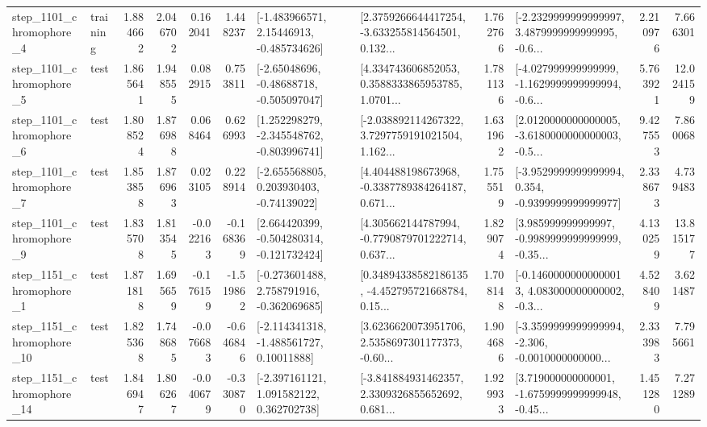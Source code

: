 \begin{tabular}{llrrrrllrlrr}
  step\_1101\_chromophore\_4 &  training &      1.884662 &    2.046702 &      0.162041 &  1.448237 &    [-1.483966571, 2.15446913, -0.485734626] &  [2.3759266644417254, -3.633255814564501, 0.132... &       1.762766 &  [-2.2329999999999997, 3.4879999999999995, -0.6... &            2.210976 &          7.666301 \\
  step\_1101\_chromophore\_5 &      test &      1.865641 &    1.948555 &      0.082915 &  0.753811 &    [-2.65048696, -0.48688718, -0.505097047] &  [4.334743606852053, 0.3588333865953785, 1.0701... &       1.781136 &  [-4.027999999999999, -1.1629999999999994, -0.6... &            5.763921 &         12.024159 \\
  step\_1101\_chromophore\_6 &      test &      1.808524 &    1.876988 &      0.068464 &  0.626993 &   [1.252298279, -2.345548762, -0.803996741] &  [-2.038892114267322, 3.7297759191021504, 1.162... &       1.631962 &  [2.0120000000000005, -3.6180000000000003, -0.5... &            9.427553 &          7.860068 \\
  step\_1101\_chromophore\_7 &      test &      1.853858 &    1.876963 &      0.023105 &  0.228914 &    [-2.655568805, 0.203930403, -0.74139022] &  [4.404488198673968, -0.3387789384264187, 0.671... &       1.755519 &  [-3.9529999999999994, 0.354, -0.9399999999999977] &            2.338673 &          4.739483 \\
  step\_1101\_chromophore\_9 &      test &      1.835708 &    1.813545 &     -0.022163 & -0.168369 &   [2.664420399, -0.504280314, -0.121732424] &  [4.305662144787994, -0.7790879701222714, 0.637... &       1.829074 &  [3.985999999999997, -0.9989999999999999, -0.35... &            4.130259 &         13.815177 \\
  step\_1151\_chromophore\_1 &      test &      1.871818 &    1.695659 &     -0.176159 & -1.519862 &   [-0.273601488, 2.758791916, -0.362069685] &  [0.34894338582186135, -4.452795721668784, 0.15... &       1.708148 &  [-0.14600000000000013, 4.083000000000002, -0.3... &            4.528409 &          3.621487 \\
 step\_1151\_chromophore\_10 &      test &      1.825368 &    1.748685 &     -0.076683 & -0.646846 &    [-2.114341318, -1.488561727, 0.10011888] &  [3.6236620073951706, 2.5358697301177373, -0.60... &       1.904686 &  [-3.3599999999999994, -2.306, -0.0010000000000... &            2.333983 &          7.795661 \\
 step\_1151\_chromophore\_14 &      test &      1.846947 &    1.806267 &     -0.040679 & -0.330870 &    [-2.397161121, 1.091582122, 0.362702738] &  [-3.841884931462357, 2.3309326855652692, 0.681... &       1.929933 &  [3.719000000000001, -1.6759999999999948, -0.45... &            1.451280 &          7.271289 \\

\end{tabular}
